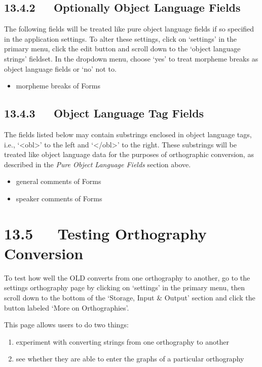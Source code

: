 \documentclass[letterpaper,10pt,english]{sphinxmanual}
\begin{document}
\subsection{13.4.2   Optionally Object Language Fields}
\label{documentation:optionally-object-language-fields}
The following fields will be treated like pure object language fields if so
specified in the application settings.  To alter these settings, click on
`settings' in the primary menu, click the edit button and scroll down to the
`object language strings' fieldset.  In the dropdown menu, choose `yes' to treat
morpheme breaks as object language fields or `no' not to.
\begin{itemize}
\item {} 
morpheme breaks of Forms

\end{itemize}


\subsection{13.4.3   Object Language Tag Fields}
\label{documentation:object-language-tag-fields}
The fields listed below may contain substrings enclosed in object language tags,
i.e., `\textless{}obl\textgreater{}' to the left and `\textless{}/obl\textgreater{}' to the right.  These substrings will be
treated like object language data for the purposes of orthographic conversion,
as described in the \emph{Pure Object Language Fields} section above.
\begin{itemize}
\item {} 
general comments of Forms

\item {} 
speaker comments of Forms

\end{itemize}


\section{13.5   Testing Orthography Conversion}
\label{documentation:testing-orthography-conversion}
To test how well the OLD converts from one orthography to another, go to the
settings orthography page by clicking on `settings' in the primary menu, then
scroll down to the bottom of the `Storage, Input \& Output' section and click
the button labeled `More on Orthographies'.

This page allows users to do two things:
\begin{enumerate}
\item {} 
experiment with converting strings from one orthography to another

\item {} 
see whether they are able to enter the graphs of a particular orthography

\end{enumerate}
\end{document}
